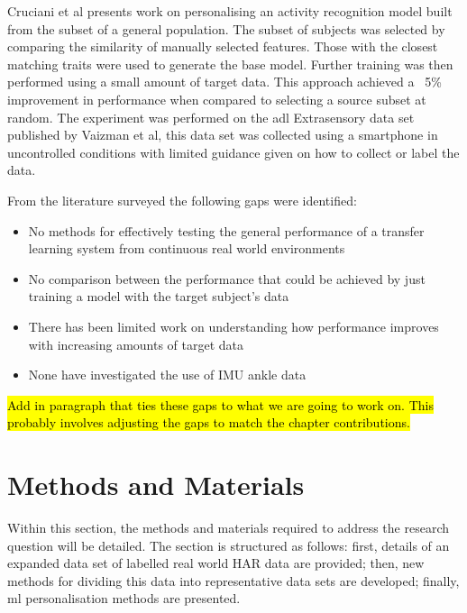 Cruciani et al presents work on personalising an activity recognition model built from the subset of a general population. The subset of subjects was selected by comparing the similarity of manually selected features. Those with the closest matching traits were used to generate the base model. Further training was then performed using a small amount of target  data. This approach achieved a ~5\% improvement in performance when compared to selecting a source subset at random\cite{Cruciani2020}. The experiment was performed on the \acrshort{adl} Extrasensory data set published by Vaizman et al\cite{Vaizman2017}, this data set was collected using a smartphone in uncontrolled conditions with limited guidance given on how to collect or label the data.

From the literature surveyed the following gaps were identified:
\begin{itemize}
\item No methods for effectively testing the general performance of a transfer learning system from continuous real world environments
\item No comparison between the performance that could be achieved by just training a model with the target subject's data
\item There has been limited work on understanding how performance improves with increasing amounts of target data
\item None have investigated the use of IMU ankle data
\end{itemize}

\hl{Add in paragraph that ties these gaps to what we are going to work on. This probably involves adjusting the gaps to match the chapter contributions.}

\section{Methods and Materials}
\label{sec:personalistaion-methods}
Within this section, the methods and materials required to address the research question will be detailed. The section is structured as follows: first, details of an expanded data set of labelled real world HAR data are provided; then, new methods for dividing this data into representative data sets are developed; finally, \acrshort{ml} personalisation methods are presented.

